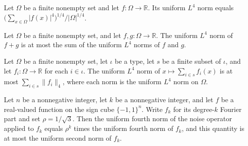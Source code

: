 \begin{theorem}
\label{FABL.uniformLpNorm_four_eq_sum_rpow_div_cardRoot}
\leanok
{}
Let $\Omega$ be a finite nonempty set and let $f:\Omega\to\mathbb R$. Its uniform
$L^4$ norm equals $\bigl(\sum_{x\in\Omega}|f(x)|^4\bigr)^{1/4}/|\Omega|^{1/4}$.
\end{theorem}

\begin{theorem}
\label{FABL.uniformLpNorm_four_add_le}
\leanok
{}
Let $\Omega$ be a finite nonempty set, and let $f,g:\Omega\to\mathbb R$. The uniform
$L^4$ norm of $f+g$ is at most the sum of the uniform $L^4$ norms of $f$ and $g$.
\end{theorem}

\begin{theorem}
\label{FABL.uniformLpNorm_four_sum_le}
\leanok
{}
Let $\Omega$ be a finite nonempty set, let $\iota$ be a type, let $s$ be a finite
subset of $\iota$, and let $f_i:\Omega\to\mathbb R$ for each $i\in\iota$. The
uniform $L^4$ norm of $x\mapsto\sum_{i\in s}f_i(x)$ is at most $\sum_{i\in
s}\|f_i\|_4$, where each norm is the uniform $L^4$ norm on $\Omega$.
\end{theorem}

\begin{theorem}
\label{FABL.homogeneous_twoFour_estimate}
\leanok
{}
Let $n$ be a nonnegative integer, let $k$ be a nonnegative integer, and let $f$ be a
real-valued function on the sign cube $\{-1,1\}^n$. Write $f_k$ for its degree-$k$
Fourier part and set $\rho=1/\sqrt{3}$. Then the uniform fourth norm of the noise
operator applied to $f_k$ equals $\rho^k$ times the uniform fourth norm of $f_k$, and
this quantity is at most the uniform second norm of $f_k$.
\end{theorem}

